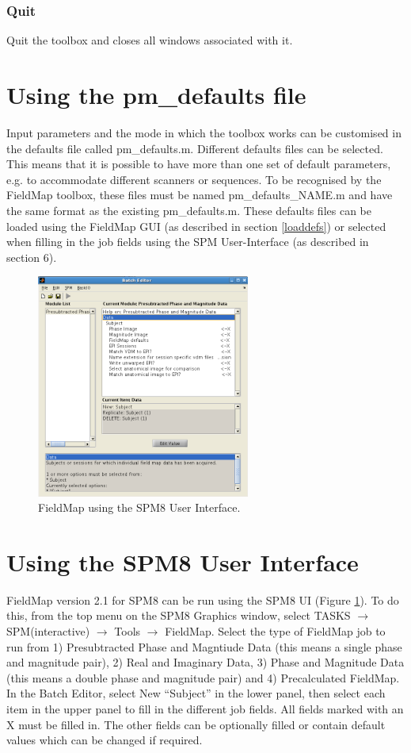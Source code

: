 \subsubsection{Quit}
Quit the toolbox and closes all windows associated with it.

\section{Using the pm\_defaults file \label{PMDEF}}
Input parameters and the mode in which the toolbox works can be customised in the defaults file called pm\_defaults.m. Different defaults files can be selected. This means that it is possible to have more than one set of default parameters, e.g. to accommodate different scanners or sequences. To be recognised by the FieldMap toolbox, these files must be named pm\_defaults\_NAME.m and have the same format as the existing pm\_defaults.m. These defaults files can be loaded using the FieldMap GUI (as described in section \ref{loaddefs}) or selected when filling in the job fields using the SPM User-Interface (as described in section 6).

\begin{figure}
\begin{center}
\includegraphics[width=70mm]{FieldMap/fieldmap_taskmgr}
\end{center}
\caption{FieldMap using the SPM8 User Interface.\label{FM2}}
\end{figure}

\section{Using the SPM8 User Interface \label{SPM8UI}}
FieldMap version 2.1 for SPM8 can be run using the SPM8 UI (Figure \ref{FM2}). To do this, from the top menu on the SPM8 Graphics window, select TASKS $\rightarrow$  SPM(interactive) $\rightarrow$ Tools $\rightarrow$  FieldMap. Select the type of FieldMap job to run from 1) Presubtracted Phase and Magntiude Data (this means a single phase and magnitude pair), 2) Real and Imaginary Data, 3) Phase and Magnitude Data (this means a double phase and magnitude pair) and 4) Precalculated FieldMap. In the Batch Editor, select New ``Subject'' in the lower panel, then select each item in the upper panel to fill in the different job fields. All fields marked with an X must be filled in. The other fields can be optionally filled or contain default values which can be changed if required.

